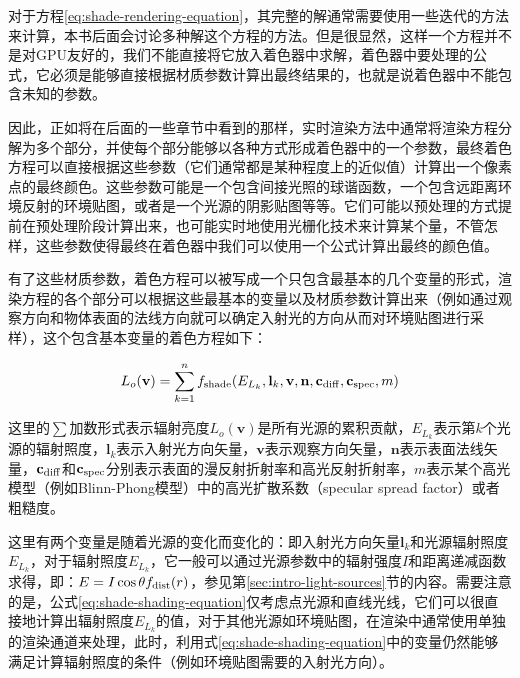 对于方程\ref{eq:shade-rendering-equation}，其完整的解通常需要使用一些迭代的方法来计算，本书后面会讨论多种解这个方程的方法。但是很显然，这样一个方程并不是对GPU友好的，我们不能直接将它放入着色器中求解，着色器中要处理的公式，它必须是能够直接根据材质参数计算出最终结果的，也就是说着色器中不能包含未知的参数。

因此，正如将在后面的一些章节中看到的那样，实时渲染方法中通常将渲染方程分解为多个部分，并使每个部分能够以各种方式形成着色器中的一个参数，最终着色方程可以直接根据这些参数（它们通常都是某种程度上的近似值）计算出一个像素点的最终颜色。这些参数可能是一个包含间接光照的球谐函数，一个包含远距离环境反射的环境贴图，或者是一个光源的阴影贴图等等。它们可能以预处理的方式提前在预处理阶段计算出来，也可能实时地使用光栅化技术来计算某个量，不管怎样，这些参数使得最终在着色器中我们可以使用一个公式计算出最终的颜色值。

有了这些材质参数，着色方程可以被写成一个只包含最基本的几个变量的形式，渲染方程的各个部分可以根据这些最基本的变量以及材质参数计算出来（例如通过观察方向和物体表面的法线方向就可以确定入射光的方向从而对环境贴图进行采样），这个包含基本变量的着色方程如下：

\begin{equation}\label{eq:shade-shading-equation}
	L_{o}(\mathbf{v})=\sum^{n}_{k=1}f_{\rm shade}(E_{L_k},\mathbf{l}_k,\mathbf{v},\mathbf{n},\mathbf{c}_{\rm diff},\mathbf{c}_{\rm spec},m)
\end{equation}

这里的$\sum$加数形式表示辐射亮度$L_o(\mathbf{v})$是所有光源的累积贡献，$E_{L_k}$表示第$k$个光源的辐射照度，$\mathbf{l}_k$表示入射光方向矢量，$\mathbf{v}$表示观察方向矢量，$\mathbf{n}$表示表面法线矢量，$\mathbf{c}_{\rm diff}$和$\mathbf{c}_{\rm spec}$分别表示表面的漫反射折射率和高光反射折射率，$m$表示某个高光模型（例如Blinn-Phong模型）中的高光扩散系数（specular spread factor）或者粗糙度。

这里有两个变量是随着光源的变化而变化的：即入射光方向矢量$\mathbf{l}_k$和光源辐射照度$E_{L_k}$，对于辐射照度$E_{L_k}$，它一般可以通过光源参数中的辐射强度$I$和距离递减函数求得，即：$E=I\cos{\theta}f_{\rm dist}(r)$，参见第\ref{sec:intro-light-sources}节的内容。需要注意的是，公式\ref{eq:shade-shading-equation}仅考虑点光源和直线光线，它们可以很直接地计算出辐射照度$E_{L_k}$的值，对于其他光源如环境贴图，在渲染中通常使用单独的渲染通道来处理，此时，利用式\ref{eq:shade-shading-equation}中的变量仍然能够满足计算辐射照度的条件（例如环境贴图需要的入射光方向）。

